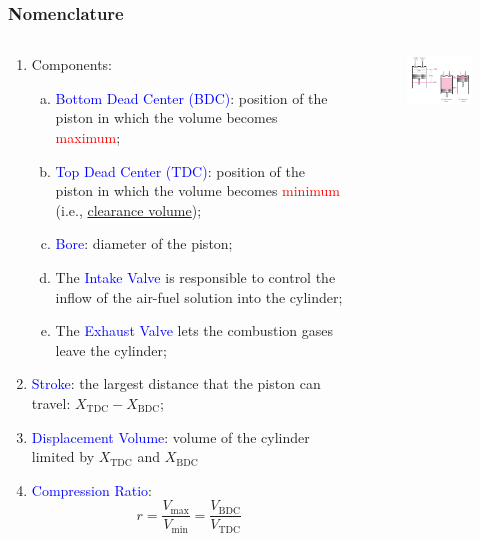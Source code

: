 \documentclass[10pt,compress]{beamer}
\newcommand{\frc}{\displaystyle\frac}
\newcommand{\red}{\textcolor{red}}
\newcommand{\blue}{\textcolor{blue}}
\begin{document}
\begin{frame}
 \frametitle{Nomenclature}
 \begin{columns}
  \begin{column}[c]{0.5\linewidth}
   \begin{enumerate}[(1)]\scriptsize
    \item<1-> Components:
      \begin{enumerate}[(a)]\scriptsize
        \item<1-> \blue{Bottom Dead Center (BDC)}: position of the piston in which the volume becomes \red{maximum};
        \item<1-> \blue{Top Dead Center (TDC)}: position of the piston in which the volume becomes \red{minimum} (i.e., \underline{clearance volume});
        \item<1-> \blue{Bore}: diameter of the piston;
        \item<1-> The \blue{Intake Valve} is responsible to control the inflow of the air-fuel solution into the cylinder;
        \item<1-> The \blue{Exhaust Valve} lets the combustion gases leave the cylinder;
      \end{enumerate} 
    \item<2-> \blue{Stroke}: the largest distance that the piston can travel: $X_{\text{TDC}}-X_{\text{BDC}}$;
    \item<2-> \blue{Displacement Volume}: volume of the cylinder limited by $X_{\text{TDC}}$ and $X_{\text{BDC}}$
    \item<3-> \blue{Compression Ratio}: 
        \begin{equation}
           r = \frc{V_{\text{max}}}{V_{\text{min}}} = \frc{V_{\text{BDC}}}{V_{\text{TDC}}}
        \end{equation}
   \end{enumerate}
  \end{column}
  \begin{column}[c]{0.5\linewidth}
   \begin{figure}%
    \begin{center}
     \includegraphics[width=6.2cm,clip]{./Pics/GasCycle_ReciprocatingEngine}
    \end{center}
   \end{figure} 
  \end{column}  
 \end{columns}
\end{frame}
\end{document}
